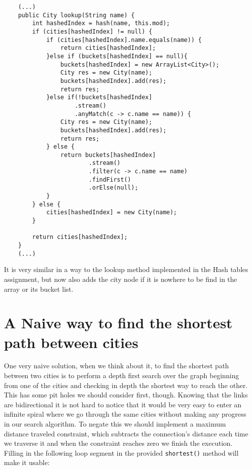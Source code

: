 \documentclass[a4paper,11pt]{article}
\begin{document}
\begin{verbatim}
    (...)
    public City lookup(String name) {
        int hashedIndex = hash(name, this.mod);
        if (cities[hashedIndex] != null) {
            if (cities[hashedIndex].name.equals(name)) {
                return cities[hashedIndex];
            }else if (buckets[hashedIndex] == null){
                buckets[hashedIndex] = new ArrayList<City>();
                City res = new City(name);
                buckets[hashedIndex].add(res);
                return res;
            }else if(!buckets[hashedIndex]
                    .stream()
                    .anyMatch(c -> c.name == name)) {
                City res = new City(name);
                buckets[hashedIndex].add(res);
                return res;
            } else {
                return buckets[hashedIndex]
                        .stream()
                        .filter(c -> c.name == name)
                        .findFirst()
                        .orElse(null);
            }
        } else {
            cities[hashedIndex] = new City(name);
        }

        return cities[hashedIndex];
    }
    (...)
\end{verbatim}
It is very similar in a way to the lookup method implemented in the Hash tables assignment, but now also adds the city node if it is nowhere to be find in the array or its bucket list.

\section*{A Naive way to find the shortest path between cities}
One very naive solution, when we think about it, to find the shortest path between two cities is to perform a depth first search over the graph beginning from one of the cities and checking in depth the shortest way to reach the other. This has some pit holes we should consider first, though. Knowing that the links are bidirectional it is not hard to notice that it would be very easy to enter an infinite spiral where we go through the same cities without making any progress in our search algorithm. To negate this we should implement a maximum distance traveled constraint, which subtracts the connection's distance each time we traverse it and when the constraint reaches zero we finish the execution. 
\\

Filling in the following loop segment in the provided {\tt shortest()} method will make it usable:
\end{document}

